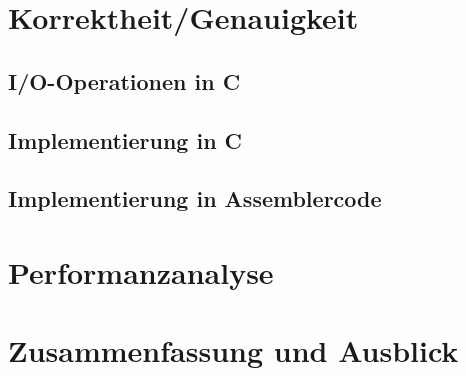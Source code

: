 \documentclass[course=asp]{aspdoc}
\begin{document}
\section{Korrektheit/Genauigkeit}
\subsection*{I/O-Operationen in C}
\subsection*{Implementierung in C}
\subsection*{Implementierung in Assemblercode}
\newpage

\section{Performanzanalyse}
\newpage

\section{Zusammenfassung und Ausblick}

\newpage


{}
\end{document}
